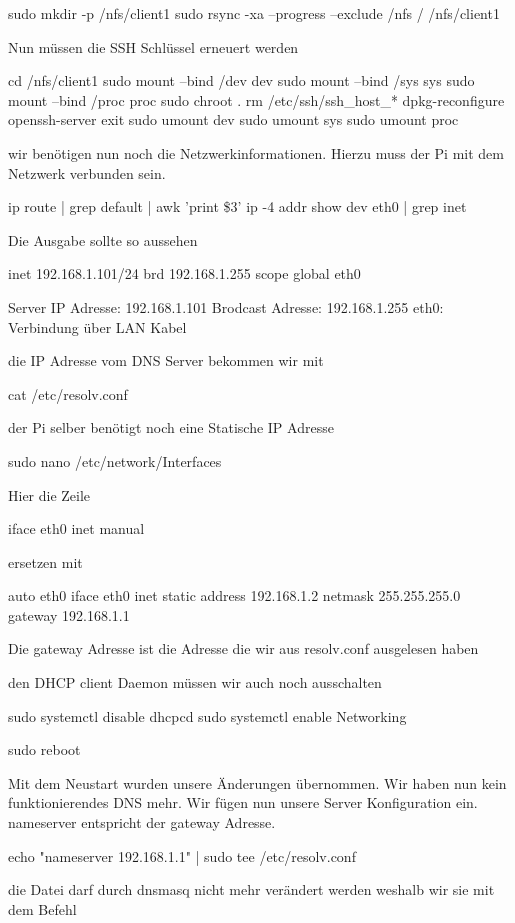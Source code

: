 \documentclass[a4paper,10pt] {article}
\begin{document}
			sudo mkdir -p /nfs/client1
			sudo rsync -xa --progress --exclude /nfs / /nfs/client1
			
			Nun müssen die SSH Schlüssel erneuert werden
			
			cd /nfs/client1
			sudo mount --bind /dev dev
			sudo mount --bind /sys sys
			sudo mount --bind /proc proc
			sudo chroot .
			rm /etc/ssh/ssh\_host\_*
			dpkg-reconfigure openssh-server
			exit
			sudo umount dev
			sudo umount sys
			sudo umount proc
			
			wir benötigen nun noch die Netzwerkinformationen. Hierzu muss der Pi mit dem Netzwerk verbunden sein.
			
			ip route | grep default | awk '{print \$3}'
			ip -4 addr show dev eth0 | grep inet
			
			Die Ausgabe sollte so aussehen
			
			inet 192.168.1.101/24 brd 192.168.1.255 scope global eth0
			
			Server IP Adresse: 192.168.1.101
			Brodcast Adresse: 192.168.1.255
			eth0: Verbindung über LAN Kabel
			
			die IP Adresse vom DNS Server bekommen wir mit 
			
			cat /etc/resolv.conf
			
			der Pi selber benötigt noch eine Statische IP Adresse
			
			sudo nano /etc/network/Interfaces
			
			Hier die Zeile 
			
			iface eth0 inet manual 
			
			ersetzen mit 
			
			auto eth0
			iface eth0 inet static 
				address 192.168.1.2
				netmask 255.255.255.0
				gateway 192.168.1.1
				
			Die gateway Adresse ist die Adresse die wir aus resolv.conf ausgelesen haben
			
			den DHCP client Daemon müssen wir auch noch ausschalten
			
			sudo systemctl disable dhcpcd
			sudo systemctl enable Networking
			
			sudo reboot
			
			Mit dem Neustart wurden unsere Änderungen übernommen. Wir haben nun kein funktionierendes DNS mehr. Wir fügen nun unsere Server Konfiguration ein. nameserver entspricht der gateway Adresse.
			 
			echo "nameserver 192.168.1.1" | sudo tee /etc/resolv.conf
			
			die Datei darf durch dnsmasq nicht mehr verändert werden weshalb wir sie mit dem Befehl
			
\end{document}
